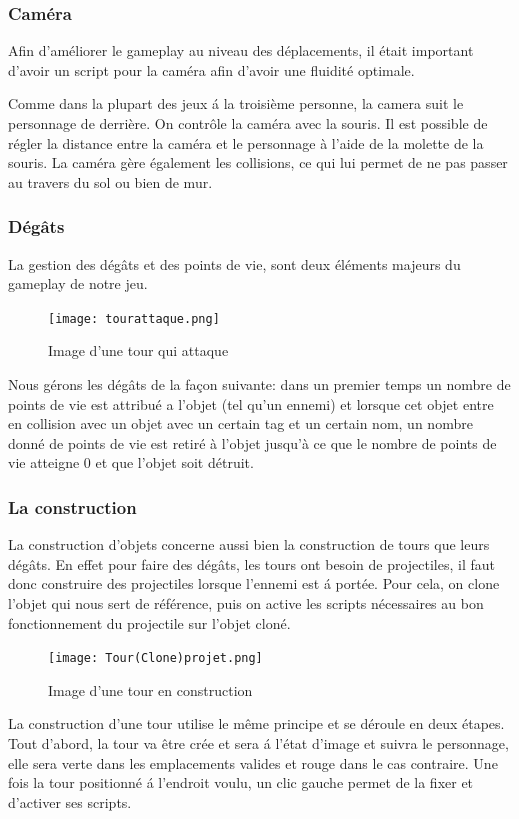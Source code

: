 \documentclass[a4paper, 12pt]{article}
\begin{document}
		\subsubsection{Caméra}
		Afin d'améliorer le gameplay au niveau des déplacements, il était important d'avoir un script pour la caméra afin d'avoir une fluidité optimale.
		\par Comme dans la plupart des jeux \'a la troisième personne, la camera suit le personnage de derrière. On contrôle la caméra avec la souris. Il est possible de régler la distance entre la caméra et le personnage à l'aide de la molette de la souris. La caméra gère également les collisions, ce qui lui permet de ne pas passer au travers du sol ou bien de mur.
		\subsubsection{Dégâts}
		La gestion des dégâts et des points de vie, sont deux éléments majeurs du gameplay de notre jeu.
	\begin{figure}[!ht]
		\centerline{\texttt{[image: tourattaque.png]}}
		\caption*{Image d'une tour qui attaque}
	\end{figure}		

		\par Nous gérons les dégâts de la façon suivante: dans un premier temps un nombre de points de vie est attribué a l'objet (tel qu'un ennemi) et lorsque cet objet entre en collision avec un objet avec un certain tag et un certain nom, un nombre donné de points de vie est retiré à l'objet jusqu'à ce que le nombre de points de vie atteigne 0 et que l'objet soit détruit.
		\subsubsection{La construction}
		La construction d'objets concerne aussi bien la construction de tours que leurs dégâts. En effet pour faire des dégâts, les tours ont besoin de projectiles, il faut donc construire des projectiles lorsque l'ennemi est \'a portée. Pour cela, on clone l'objet qui nous sert de référence, puis on active les scripts nécessaires au bon fonctionnement du projectile sur l'objet cloné.
	\begin{figure}[!ht]	
		\centerline{\texttt{[image: Tour(Clone)projet.png]}}	
		\caption*{Image d'une tour en construction}	
	\end{figure}
		
		\par La construction d'une tour utilise le même principe et se déroule en deux étapes. Tout d'abord, la tour va être crée et sera \'a l'état d'image et suivra le personnage, elle sera verte dans les emplacements valides et rouge dans le cas contraire. Une fois la tour positionné \'a l'endroit voulu, un clic gauche permet de la fixer et d'activer ses scripts.
		
\end{document}
